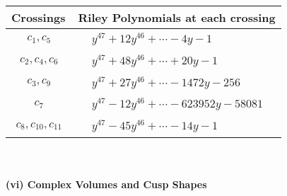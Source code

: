 \documentclass[1p]{elsarticle_modified}
\theoremstyle{definition}
\begin{document}
\begin{tabular}{m{50pt}|m{274pt}}
Crossings & \hspace{64pt}Riley Polynomials at each crossing \\
\hline $$\begin{aligned}c_{1},c_{5}\end{aligned}$$&$\begin{aligned}
&y^{47}+12 y^{46}+\cdots-4 y-1
\end{aligned}$\\
\hline $$\begin{aligned}c_{2},c_{4},c_{6}\end{aligned}$$&$\begin{aligned}
&y^{47}+48 y^{46}+\cdots+20 y-1
\end{aligned}$\\
\hline $$\begin{aligned}c_{3},c_{9}\end{aligned}$$&$\begin{aligned}
&y^{47}+27 y^{46}+\cdots-1472 y-256
\end{aligned}$\\
\hline $$\begin{aligned}c_{7}\end{aligned}$$&$\begin{aligned}
&y^{47}-12 y^{46}+\cdots-623952 y-58081
\end{aligned}$\\
\hline $$\begin{aligned}c_{8},c_{10},c_{11}\end{aligned}$$&$\begin{aligned}
&y^{47}-45 y^{46}+\cdots-14 y-1
\end{aligned}$\\
\hline
\end{tabular}\\~\\
\newpage\flushleft \textbf{(vi) Complex Volumes and Cusp Shapes}
\end{document}
